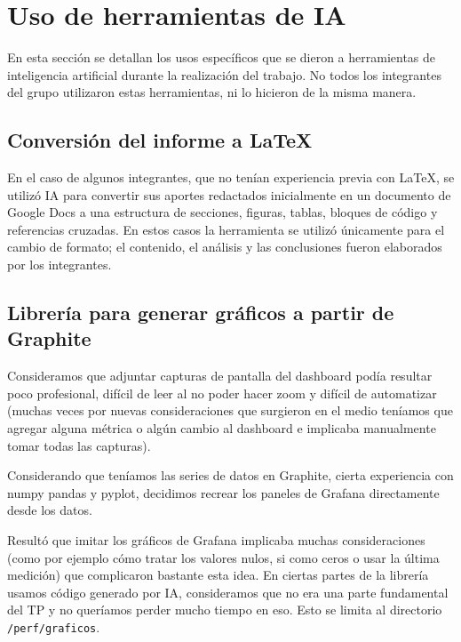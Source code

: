\section{Uso de herramientas de IA}
\label{sec:uso_de_herramientas_de_ia}

    En esta sección se detallan los usos específicos que se dieron a herramientas de inteligencia artificial durante la
    realización del trabajo. No todos los integrantes del grupo utilizaron estas herramientas, ni lo hicieron de la misma
    manera.

    \subsection{Conversión del informe a \LaTeX}
    \label{sec:uso_de_ia_conversion_a_latex}

    En el caso de algunos integrantes, que no tenían experiencia previa con \LaTeX, se utilizó IA para convertir sus aportes
    redactados inicialmente en un documento de Google Docs a una estructura de secciones, figuras, tablas, bloques de código y referencias
    cruzadas. En estos casos la herramienta se utilizó únicamente para el cambio de formato; el contenido, el análisis y
    las conclusiones fueron elaborados por los integrantes.

    \subsection{Librería para generar gráficos a partir de Graphite}
    \label{sec:uso_de_ia_libreria_graficos}

    Consideramos que adjuntar capturas de pantalla del dashboard podía resultar poco profesional, difícil de leer al no poder hacer zoom y difícil de automatizar (muchas veces por nuevas consideraciones que surgieron en el medio teníamos que agregar alguna métrica o algún cambio al dashboard e implicaba manualmente tomar todas las capturas).

    Considerando que teníamos las series de datos en Graphite, cierta experiencia con numpy pandas y pyplot, decidimos recrear los paneles de Grafana directamente desde los datos.

    Resultó que imitar los gráficos de Grafana implicaba muchas consideraciones (como por ejemplo cómo tratar los valores nulos, si como ceros o usar la última medición) que complicaron bastante esta idea. En ciertas partes de la librería usamos código generado por IA, consideramos que no era una parte fundamental del TP y no queríamos perder mucho tiempo en eso. Esto se limita al directorio \texttt{/perf/graficos}.

